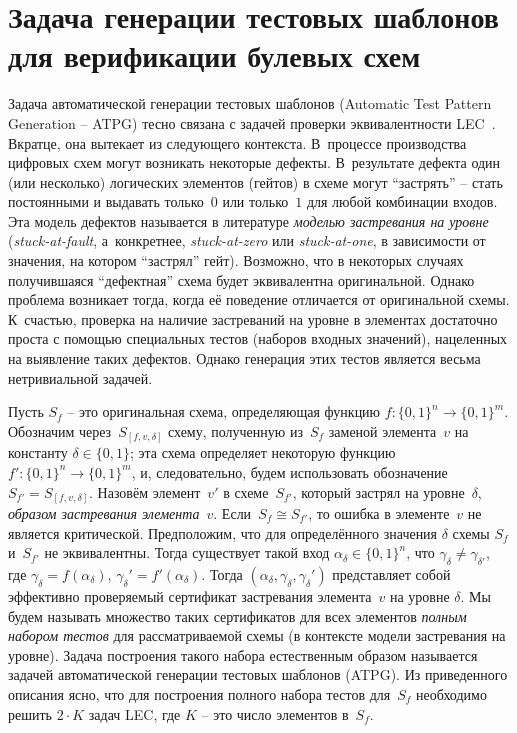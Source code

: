 

\section{Задача генерации тестовых шаблонов для верификации булевых схем}
\label{sec:atpg}

Задача автоматической генерации тестовых шаблонов (Automatic Test Pattern Generation \--- ATPG) тесно связана с задачей проверки эквивалентности LEC~\cite{drechsler2021}.
Вкратце, она вытекает из следующего контекста.
В~процессе производства цифровых схем могут возникать некоторые дефекты.
В~результате дефекта один (или несколько) логических элементов (гейтов) в схеме могут \enquote{застрять} \--- стать постоянными и выдавать только~$0$ или только~$1$ для любой комбинации входов.
Эта модель дефектов называется в литературе \textit{моделью застревания на уровне} (\textit{stuck-at-fault}, а~конкретнее, \textit{stuck-at-zero} или \textit{stuck-at-one}, в зависимости от значения, на котором \enquote{застрял} гейт).
Возможно, что в некоторых случаях получившаяся \enquote{дефектная} схема будет эквивалентна оригинальной.
Однако проблема возникает тогда, когда её поведение отличается от оригинальной схемы.
К~счастью, проверка на наличие застреваний на уровне в элементах достаточно проста с помощью специальных тестов (наборов входных значений), нацеленных на выявление таких дефектов.
Однако генерация этих тестов является весьма нетривиальной задачей.

Пусть $S_f$ \--- это оригинальная схема, определяющая функцию $f \colon \{0,1\}^n \to \{0,1\}^m$.
Обозначим через~$S_{[f,v,\delta]}$ схему, полученную из~$S_f$ заменой элемента~$v$ на константу $\delta \in \{0,1\}$; эта схема определяет некоторую функцию $f' \colon \{0,1\}^n \to \{0,1\}^m$, и, следовательно, будем использовать обозначение $S_{f'} = S_{[f,v,\delta]}$.
Назовём элемент~$v'$ в схеме~$S_{f'}$, который застрял на уровне~$\delta$, \textit{образом застревания элемента}~$v$.
Если~$S_f \cong S_{f'}$, то ошибка в элементе~$v$ не является критической.
Предположим, что для определённого значения $\delta$ схемы $S_f$ и~$S_{f'}$ не эквивалентны.
Тогда существует такой вход $\alpha_\delta \in \{0,1\}^n$, что $\gamma_\delta \neq \gamma_{\delta'}$, где $\gamma_\delta = f(\alpha_\delta)$, $\gamma_\delta' = f'(\alpha_\delta)$.
Тогда $(\alpha_\delta, \gamma_\delta, \gamma_\delta')$ представляет собой эффективно проверяемый сертификат застревания элемента~$v$ на уровне $\delta$.
Мы будем называть множество таких сертификатов для всех элементов \textit{полным набором тестов} для рассматриваемой схемы (в контексте модели застревания на уровне).
Задача построения такого набора естественным образом называется задачей автоматической генерации тестовых шаблонов (ATPG).
Из приведенного описания ясно, что для построения полного набора тестов для~$S_f$ необходимо решить $2 \cdot K$ задач LEC, где $K$ \--- это число элементов в~$S_f$.

